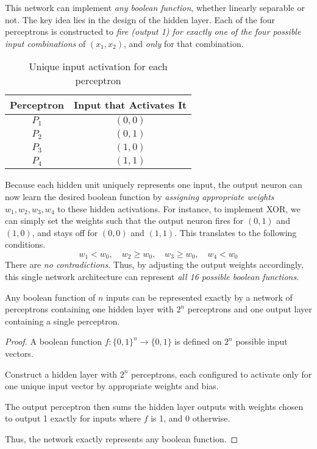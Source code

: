 This network can implement \textit{any boolean function}, whether linearly separable or not. The key idea lies in the design of the hidden layer. Each of the four perceptrons is constructed to \textit{fire (output 1) for exactly one of the four possible input combinations} of $(x_1, x_2)$, and \textit{only} for that combination.

\begin{table}[h]
\centering
\begin{tabular}{cc}
\textbf{Perceptron} & \textbf{Input that Activates It} \\
\hline
$P_1$ & $(0, 0)$ \\
$P_2$ & $(0, 1)$ \\
$P_3$ & $(1, 0)$ \\
$P_4$ & $(1, 1)$ \\
\end{tabular}
\caption{Unique input activation for each perceptron}
\end{table}

Because each hidden unit uniquely represents one input, the output neuron can now learn the desired boolean function by \textit{assigning appropriate weights} $w_1, w_2, w_3, w_4$ to these hidden activations. For instance, to implement XOR, we can simply set the weights such that the output neuron fires for $(0,1)$ and $(1,0)$, and stays off for $(0,0)$ and $(1,1)$. This translates to the following conditions.
\[
w_1 < w_0,\quad w_2 \geq w_0,\quad w_3 \geq w_0,\quad w_4 < w_0
\]
There are \textit{no contradictions}. Thus, by adjusting the output weights accordingly, this single network architecture can represent \textit{all 16 possible boolean functions}.

\begin{theorem}
    Any boolean function of \( n \) inputs can be represented exactly by a network of perceptrons containing one hidden layer with \( 2^n \) perceptrons and one output layer containing a single perceptron.
\end{theorem}

\begin{proof}
A boolean function \( f: \{0,1\}^n \to \{0,1\} \) is defined on \( 2^n \) possible input vectors.

Construct a hidden layer with \( 2^n \) perceptrons, each configured to activate only for one unique input vector by appropriate weights and bias.

The output perceptron then sums the hidden layer outputs with weights chosen to output 1 exactly for inputs where \( f \) is 1, and 0 otherwise.

Thus, the network exactly represents any boolean function.
\end{proof}

